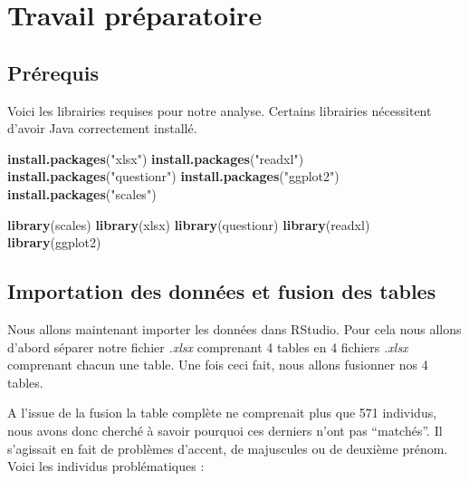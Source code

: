 \documentclass[]{article}
\newenvironment{Shaded}{\begin{snugshade}}{\end{snugshade}}
\newcommand{\KeywordTok}[1]{\textcolor[rgb]{0.13,0.29,0.53}{\textbf{#1}}}
\newcommand{\NormalTok}[1]{#1}
\newcommand{\StringTok}[1]{\textcolor[rgb]{0.31,0.60,0.02}{#1}}
\begin{document}
\hypertarget{travail-pruxe9paratoire}{%
\section{Travail préparatoire}\label{travail-pruxe9paratoire}}

\hypertarget{pruxe9requis}{%
\subsection{Prérequis}\label{pruxe9requis}}

Voici les librairies requises pour notre analyse. Certains librairies
nécessitent d'avoir Java correctement installé.

\begin{Shaded}
\begin{Highlighting}[]
\KeywordTok{install.packages}\NormalTok{(}\StringTok{"xlsx"}\NormalTok{)}
\KeywordTok{install.packages}\NormalTok{(}\StringTok{"readxl"}\NormalTok{)}
\KeywordTok{install.packages}\NormalTok{(}\StringTok{"questionr"}\NormalTok{)}
\KeywordTok{install.packages}\NormalTok{(}\StringTok{"ggplot2"}\NormalTok{)}
\KeywordTok{install.packages}\NormalTok{(}\StringTok{"scales"}\NormalTok{)}
\end{Highlighting}
\end{Shaded}

\begin{Shaded}
\begin{Highlighting}[]
\KeywordTok{library}\NormalTok{(scales)}
\KeywordTok{library}\NormalTok{(xlsx)}
\KeywordTok{library}\NormalTok{(questionr)}
\KeywordTok{library}\NormalTok{(readxl)}
\KeywordTok{library}\NormalTok{(ggplot2)}
\end{Highlighting}
\end{Shaded}

\hypertarget{importation-des-donnuxe9es-et-fusion-des-tables}{%
\subsection{Importation des données et fusion des
tables}\label{importation-des-donnuxe9es-et-fusion-des-tables}}

Nous allons maintenant importer les données dans RStudio. Pour cela nous
allons d'abord séparer notre fichier \emph{.xlsx} comprenant 4 tables en
4 fichiers \emph{.xlsx} comprenant chacun une table. Une fois ceci fait,
nous allons fusionner nos 4 tables.

A l'issue de la fusion la table complète ne comprenait plus que 571
individus, nous avons donc cherché à savoir pourquoi ces derniers n'ont
pas ``matchés''. Il s'agissait en fait de problèmes d'accent, de
majuscules ou de deuxième prénom. Voici les individus problématiques :
\end{document}

